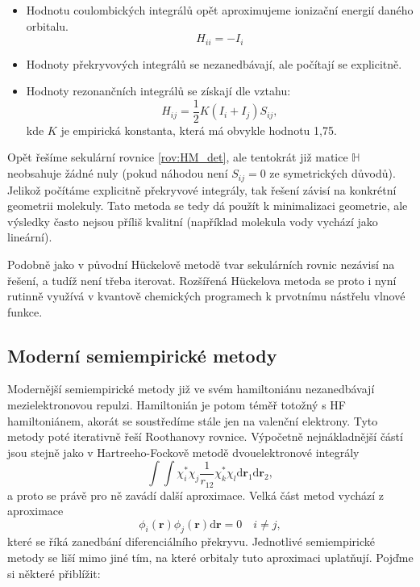 \begin{itemize}
\item Hodnotu coulombických integrálů opět aproximujeme ionizační energií daného orbitalu.
$$H_{ii}=-I_i$$
\item Hodnoty překryvových integrálů se nezanedbávají, ale počítají se explicitně.
\item Hodnoty rezonančních integrálů se získají dle vztahu:
\begin{equation}
H_{ij}=\frac{1}{2}K(I_i+I_j)S_{ij},
\end{equation}
kde $K$ je empirická konstanta, která má obvykle hodnotu 1,75.
\end{itemize}
Opět řešíme sekulární rovnice \eqref{rov:HM_det}, ale tentokrát již matice $\mathbb{H}$ neobsahuje žádné nuly (pokud náhodou není $S_{ij}=0$ ze symetrických důvodů). Jelikož počítáme explicitně překryvové integrály, tak řešení závisí na konkrétní geometrii molekuly. Tato metoda se tedy dá použít k minimalizaci geometrie, ale výsledky často nejsou příliš kvalitní (například molekula vody vychází jako lineární).

Podobně jako v původní H\"{u}ckelově metodě tvar sekulárních rovnic nezávisí na řešení, a tudíž není třeba iterovat. Rozšířená H\"{u}ckelova metoda se proto i nyní rutinně využívá v kvantově chemických programech k prvotnímu nástřelu vlnové funkce.

\subsection{Moderní semiempirické metody}

Modernější semiempirické metody již ve svém hamiltoniánu nezanedbávají mezielektronovou repulzi.
Hamiltonián je potom téměř totožný s HF hamiltoniánem, akorát se soustředíme stále jen na valenční elektrony. Tyto metody poté iterativně řeší Roothanovy rovnice. Výpočetně nejnákladnější částí jsou stejně jako v Hartreeho-Fockově metodě dvouelektronové integrály
\begin{equation}
\int \int \chi_i^*\chi_j\frac{1}{r_{12}}\chi_k^*\chi_l \mathrm{d}\textbf{r}_1\mathrm{d}\textbf{r}_2 ,
\end{equation}
a proto se právě pro ně zavádí další aproximace. Velká část metod vychází z aproximace 
\begin{equation}
\phi_i(\mathbf{r}) \phi_j(\mathbf{r}) \mathrm{d}\mathbf{r} = 0 \quad i\neq j,
\label{rov:semiemp:4e}
\end{equation}
které se říká zanedbání diferenciálního překryvu. Jednotlivé semiempirické metody se liší mimo jiné tím, na které orbitaly tuto aproximaci uplatňují. Pojďme si některé přiblížit:

